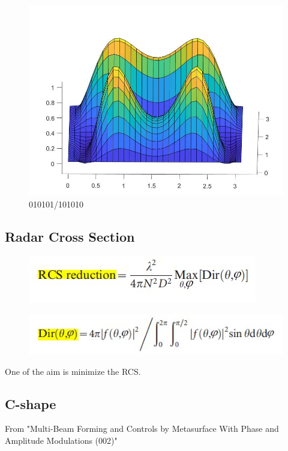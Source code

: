 \documentclass[]{article}
\begin{document}
	\begin{figure}[H]
		\centering
		\includegraphics[scale=0.3]{Fig/7.jpg}
		\caption{010101/101010}
	\end{figure}


	\subsection*{Radar Cross Section}
	
		\begin{figure}[H]
		\centering
		\includegraphics[scale=0.8]{Fig/8.jpg}
	\end{figure}
	
	\begin{figure}[H]
		\centering
		\includegraphics[scale=0.8]{Fig/9.jpg}
	\end{figure}

	\par One of the aim is minimize the RCS.
	
	\subsection*{C-shape}
	\par From "Multi-Beam Forming and Controls by Metasurface With Phase 
	and Amplitude Modulations (002)"
	
\end{document}
